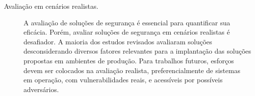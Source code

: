 \begin{description}
    \item[Avaliação em cenários realistas.]  A avaliação de soluções de segurança é essencial para quantificar sua eficácia.  Porém, avaliar soluções de segurança em cenários realistas é desafiador.  A maioria dos estudos revisados avaliaram soluções desconsiderando diversos fatores relevantes para a implantação das soluções propostas em ambientes de produção.  Para trabalhos futuros, esforços devem ser colocados na avaliação realista, preferencialmente de sistemas em operação, com vulnerabilidades reais, e acessíveis por possíveis adversários.
    
\end{description}


